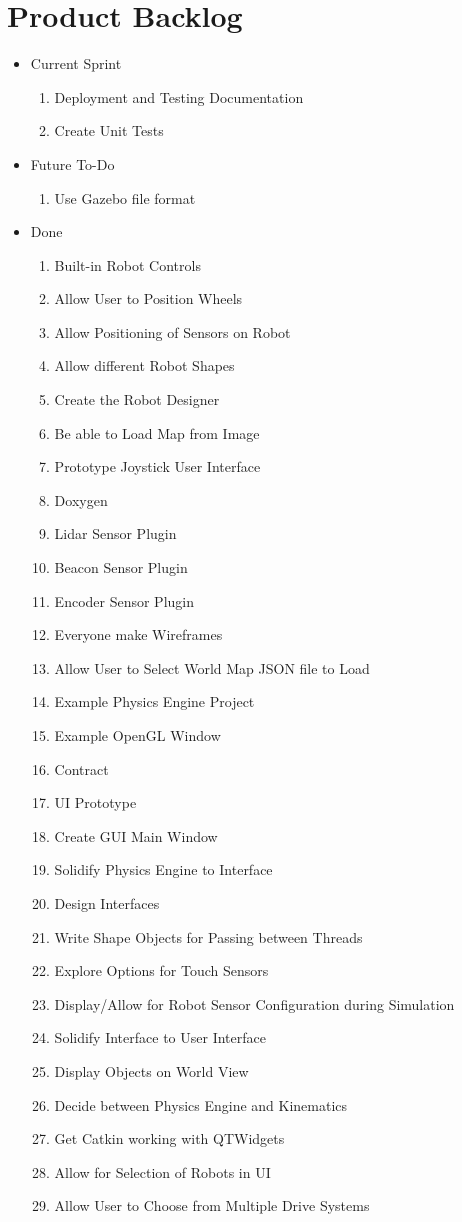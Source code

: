 \section{Product Backlog}
 
\begin{itemize}
\item Current Sprint 
\begin{enumerate}
\item Deployment and Testing Documentation
\item Create Unit Tests
\end{enumerate}
\item Future To-Do 
\begin{enumerate}
\item Use Gazebo file format
\end{enumerate}
\item Done
\begin{enumerate}
\item Built-in Robot Controls 
\item Allow User to Position Wheels
\item Allow Positioning of Sensors on Robot
\item Allow different Robot Shapes
\item Create the Robot Designer
\item Be able to Load Map from Image
\item Prototype Joystick User Interface
\item Doxygen
\item Lidar Sensor Plugin
\item Beacon Sensor Plugin
\item Encoder Sensor Plugin
\item Everyone make Wireframes
\item Allow User to Select World Map JSON file to Load
\item Example Physics Engine Project
\item Example OpenGL Window
\item Contract
\item UI Prototype
\item Create GUI Main Window
\item Solidify Physics Engine to Interface
\item Design Interfaces
\item Write Shape Objects for Passing between Threads
\item Explore Options for Touch Sensors
\item Display/Allow for Robot Sensor Configuration during Simulation
\item Solidify Interface to User Interface
\item Display Objects on World View
\item Decide between Physics Engine and Kinematics
\item Get Catkin working with QTWidgets
\item Allow for Selection of Robots in UI
\item Allow User to Choose from Multiple Drive Systems
\end{enumerate}
\end{itemize}

